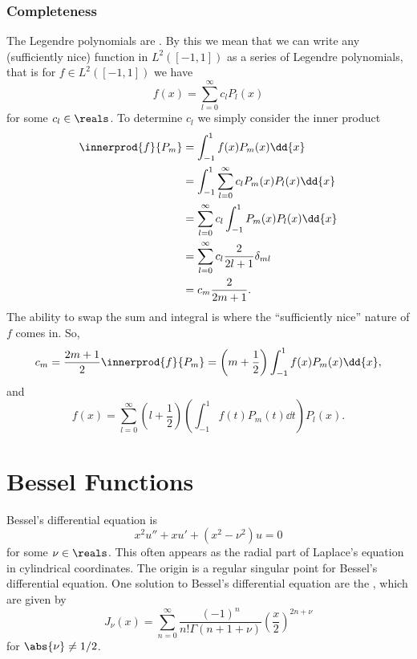 \documentclass[fleqn]{NotesClass}
\begin{document}
    \subsubsection{Completeness}
    The Legendre polynomials are .
    By this we mean that we can write any (sufficiently nice) function in \(L^2([-1, 1])\) as a series of Legendre polynomials, that is for \(f \in L^2([-1, 1])\) we have
    \begin{equation}
        f(x) = \sum_{l=0}^{\infty} c_lP_l(x)
    \end{equation}
    for some \(c_l \in \reals\).
    To determine \(c_l\) we simply consider the inner product
    \begin{align}
        \innerprod{f}{P_m} &= \int_{-1}^{1} f(x)P_m(x)\dd{x}\\
        &= \int_{-1}^{1} \sum_{l=0}^{\infty} c_lP_m(x)P_l(x)\dd{x}\\
        &= \sum_{l=0}^{\infty} c_l \int_{-1}^{1} P_m(x)P_l(x)\dd{x}\\
        &= \sum_{l=0}^{\infty} c_l\frac{2}{2l + 1}\delta_{ml}\\
        &= c_m\frac{2}{2m + 1}.
    \end{align}
    The ability to swap the sum and integral is where the \enquote{sufficiently nice} nature of \(f\) comes in.
    So,
    \begin{equation}
        c_m = \frac{2m + 1}{2}\innerprod{f}{P_m} = \left( m + \frac{1}{2} \right) \int_{-1}^{1} f(x)P_m(x) \dd{x},
    \end{equation}
    and
    \begin{equation}
        f(x) = \sum_{l=0}^{\infty} \left( l + \frac{1}{2} \right) \left( \int_{-1}^{1} f(t) P_m(t) \dd{t} \right) P_l(x).
    \end{equation}

    \section{Bessel Functions}
    Bessel's differential equation is
    \begin{equation}
        x^2u'' + xu' + (x^2 - \nu^2)u = 0
    \end{equation}
    for some \(\nu \in \reals\).
    This often appears as the radial part of Laplace's equation in cylindrical coordinates.
    The origin is a regular singular point for Bessel's differential equation.
    One solution to Bessel's differential equation are the , which are given by
    \begin{equation}
        J_\nu(x) = \sum_{n=0}^{\infty} \frac{(-1)^n}{n!\Gamma(n + 1 + \nu)} \left( \frac{x}{2} \right)^{2n + \nu}
    \end{equation}
    for \(\abs{\nu} \ne 1/2\).
    
\end{document}
